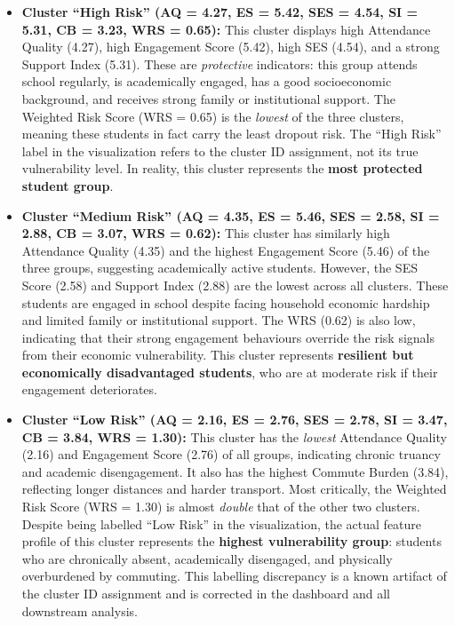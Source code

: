 \begin{itemize}
    \item \textbf{Cluster ``High Risk'' (AQ = 4.27, ES = 5.42, SES = 4.54, SI = 5.31, CB = 3.23, WRS = 0.65):}
    This cluster displays high Attendance Quality (4.27), high Engagement Score (5.42), high SES (4.54), and a strong Support Index (5.31). These are \textit{protective} indicators: this group attends school regularly, is academically engaged, has a good socioeconomic background, and receives strong family or institutional support. The Weighted Risk Score (WRS = 0.65) is the \textit{lowest} of the three clusters, meaning these students in fact carry the least dropout risk. The ``High Risk'' label in the visualization refers to the cluster ID assignment, not its true vulnerability level. In reality, this cluster represents the \textbf{most protected student group}.

    \item \textbf{Cluster ``Medium Risk'' (AQ = 4.35, ES = 5.46, SES = 2.58, SI = 2.88, CB = 3.07, WRS = 0.62):}
    This cluster has similarly high Attendance Quality (4.35) and the highest Engagement Score (5.46) of the three groups, suggesting academically active students. However, the SES Score (2.58) and Support Index (2.88) are the lowest across all clusters. These students are engaged in school despite facing household economic hardship and limited family or institutional support. The WRS (0.62) is also low, indicating that their strong engagement behaviours override the risk signals from their economic vulnerability. This cluster represents \textbf{resilient but economically disadvantaged students}, who are at moderate risk if their engagement deteriorates.

    \item \textbf{Cluster ``Low Risk'' (AQ = 2.16, ES = 2.76, SES = 2.78, SI = 3.47, CB = 3.84, WRS = 1.30):}
    This cluster has the \textit{lowest} Attendance Quality (2.16) and Engagement Score (2.76) of all groups, indicating chronic truancy and academic disengagement. It also has the highest Commute Burden (3.84), reflecting longer distances and harder transport. Most critically, the Weighted Risk Score (WRS = 1.30) is almost \textit{double} that of the other two clusters. Despite being labelled ``Low Risk'' in the visualization, the actual feature profile of this cluster represents the \textbf{highest vulnerability group}: students who are chronically absent, academically disengaged, and physically overburdened by commuting. This labelling discrepancy is a known artifact of the cluster ID assignment and is corrected in the dashboard and all downstream analysis.
\end{itemize}

